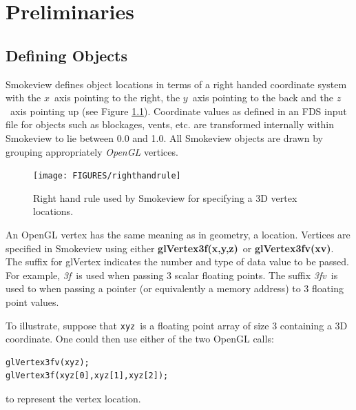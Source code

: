 \documentclass[11pt,twoside]{book}
\begin{document}
%
%

\chapter{Preliminaries}
\label{visoverview}
\section{Defining Objects} Smokeview defines object locations in terms of a right handed coordinate system with the $x$~axis pointing to the right, the $y$~axis pointing to the back and the $z$~axis pointing up (see Figure \ref{figrighthand}).  Coordinate values as defined in an FDS input file for objects such as blockages, vents, etc. are transformed internally within Smokeview to lie between 0.0 and 1.0. All Smokeview objects are drawn by grouping appropriately {\em OpenGL} vertices.
\begin{figure}[\figoptions]
\begin{center}
\texttt{[image: FIGURES/righthandrule]}
\end{center}
\caption{Right hand rule used by Smokeview for specifying a 3D vertex locations.}
\label{figrighthand}
\end{figure}

An OpenGL vertex has the same meaning as in geometry, a location. Vertices are specified in Smokeview using either {\bf glVertex3f(x,y,z)}\ or {\bf glVertex3fv(xv)}.  The suffix for glVertex indicates the number and type of data value to be passed.  For example, {\em 3f}\ is used when passing 3 scalar floating points.  The suffix {\em 3fv}\ is used to when passing a pointer (or equivalently a memory address) to 3 floating point  values.

To illustrate, suppose that {\tt xyz}\ is a floating point array of size 3 containing a 3D coordinate.  One could then use either of the two OpenGL calls:
\begin{lstlisting}
glVertex3fv(xyz);
glVertex3f(xyz[0],xyz[1],xyz[2]);
\end{lstlisting}
to represent the vertex location.
\end{document}
